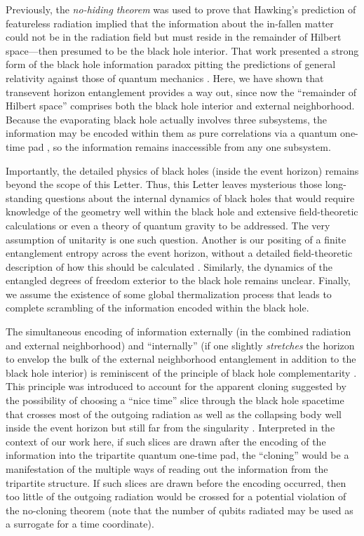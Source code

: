 \documentclass[twocolumn,aps,showpacs,prl]{revtex4}
\begin{document}
Previously, the {\it no-hiding theorem} \cite{me,Kretschmann} was used to
prove that Hawking's prediction of featureless radiation implied that the
information about the in-fallen matter could not be in the radiation
field but must reside in the remainder of Hilbert space---then
presumed to be the black hole interior. That work presented a strong
form of the black hole information paradox pitting the predictions of
general relativity against those of quantum mechanics \cite{me}. Here,
we have shown that transevent horizon entanglement provides a way out,
since now the ``remainder of Hilbert space'' comprises both the black
hole interior and external neighborhood. Because the evaporating
black hole actually involves three subsystems, the information may be
encoded within them as pure correlations via a quantum one-time
pad \cite{me}, so the information remains inaccessible from any
one subsystem.

Importantly, the detailed physics of black holes (inside the event
horizon) remains beyond the scope of this Letter. Thus, this Letter
leaves mysterious those long-standing questions about the internal
dynamics of black holes that would require knowledge of the geometry
well within the black hole and extensive field-theoretic calculations
or even a theory of quantum gravity to be addressed. The very assumption
of unitarity is one such question. Another is our positing of a finite
entanglement entropy across the event horizon, without a detailed
field-theoretic description of how this should be
calculated \cite{tHooft85,Hawking01,Brustein06,Emparan06,Pad10}.
Similarly, the dynamics of the entangled degrees of
freedom exterior to the black hole remains unclear.
Finally, we assume the existence of some global thermalization process 
that leads to complete scrambling of the information encoded within the 
black hole.

The simultaneous encoding of information externally (in the combined
radiation and external neighborhood) and ``internally'' (if one slightly
{\it stretches\/} the horizon to envelop the bulk of the external
neighborhood entanglement in addition to the black hole interior)
is reminiscent of the principle of black hole complementarity
\cite{Susskind93}. This principle was introduced to account for the
apparent cloning suggested by the possibility of choosing a ``nice time''
slice through the black hole spacetime that crosses most of the
outgoing radiation as well as the collapsing body well inside the
event horizon but still far from the singularity \cite{Lowe95}.
Interpreted in the context of our work here, if such slices are drawn
after the encoding of the information into the tripartite quantum
one-time pad, the ``cloning'' would be a manifestation of the multiple
ways of reading out the information from the tripartite structure.
If such slices are drawn before the encoding occurred, then too
little of the outgoing radiation would be crossed for a potential
violation of the no-cloning theorem (note that the number of qubits
radiated may be used as a surrogate for a time coordinate).
\end{document}
